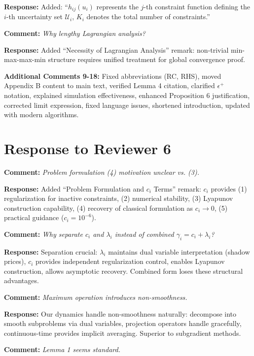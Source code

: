 \documentclass[11pt]{article}
\newcommand{\reviewercomment}[1]{\textbf{Comment:} \textit{#1}}
\newcommand{\response}[1]{\textbf{Response:} #1}
\begin{document}
\response{Added: ``$h_{ij}(u_i)$ represents the $j$-th constraint function defining the $i$-th uncertainty set $\mathcal{U}_i$, $K_i$ denotes the total number of constraints.''}

\reviewercomment{Why lengthy Lagrangian analysis?}

\response{Added ``Necessity of Lagrangian Analysis'' remark: non-trivial min-max-max-min structure requires unified treatment for global convergence proof.}

\textbf{Additional Comments 9-18:} Fixed abbreviations (RC, RHS), moved Appendix B content to main text, verified Lemma 4 citation, clarified $\epsilon^+$ notation, explained simulation effectiveness, enhanced Proposition 6 justification, corrected limit expression, fixed language issues, shortened introduction, updated with modern algorithms.

\section*{Response to Reviewer 6}

\reviewercomment{Problem formulation (4) motivation unclear vs. (3).}

\response{Added ``Problem Formulation and $c_i$ Terms'' remark: $c_i$ provides (1) regularization for inactive constraints, (2) numerical stability, (3) Lyapunov construction capability, (4) recovery of classical formulation as $c_i \to 0$, (5) practical guidance ($c_i = 10^{-6}$).}

\reviewercomment{Why separate $c_i$ and $\lambda_i$ instead of combined $\gamma_i = c_i + \lambda_i$?}

\response{Separation crucial: $\lambda_i$ maintains dual variable interpretation (shadow prices), $c_i$ provides independent regularization control, enables Lyapunov construction, allows asymptotic recovery. Combined form loses these structural advantages.}

\reviewercomment{Maximum operation introduces non-smoothness.}

\response{Our dynamics handle non-smoothness naturally: decompose into smooth subproblems via dual variables, projection operators handle gracefully, continuous-time provides implicit averaging. Superior to subgradient methods.}

\reviewercomment{Lemma 1 seems standard.}
\end{document}

